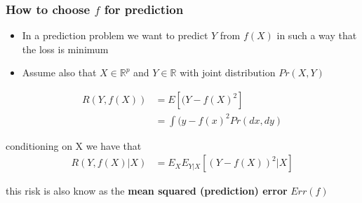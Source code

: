 \documentclass[
  shownotes,
  xcolor={svgnames},
  hyperref={colorlinks,citecolor=DarkBlue,linkcolor=DarkRed,urlcolor=DarkBlue}
  ]{beamer}
\begin{document}
\begin{comment}
\begin{frame}
\frametitle{Statistical Decision Theory: A bit of theory}
\framesubtitle{Risk Function}

\textbf{Frequentist Approach}

\[
E_{\theta}L\left(\delta\left(\underline{X}\right),\theta\right)=R\left(\delta,\theta\right)
\]

note that $\underline{X}$ are generated from a model with parameter
$\theta$.

\textbf{Bayesian Approach}

\[
E_{\theta}\left[L\left(\delta\left(\underline{X}\right),\theta\right)|\theta=\theta_{0}\right]=R\left(\delta,\theta_{0}\right)
\]

In the bayesian approach the data is generated from $\underline{X}|\theta=\theta_{0}$,
the parameter is not fixed, comes from a distribution.

\end{frame}
\end{comment}
\begin{frame}
\frametitle{How to choose $f$ for prediction}
\begin{itemize}
  \item In a prediction problem we want to predict $Y$ from $f(X)$ in such a way that the loss is minimum
  \item Assume also that $X \in \mathbb{R}^p$ and $Y \in \mathbb{R}$ with joint distribution $Pr(X,Y)$
\end{itemize}

\begin{align}
  R(Y,f(X)) &=E[(Y-f(X)^2] \\
            &=\int (y-f(x)^2 Pr(dx,dy)
\end{align}

conditioning on X we have that
\begin{align}
 R(Y,f(X)|X) &= E_X E_{Y|X} [(Y-f(X))^2|X] 
\end{align}

this risk is also know as the {\bf mean squared (prediction) error} $Err(f)$
\end{frame}
\end{document}
